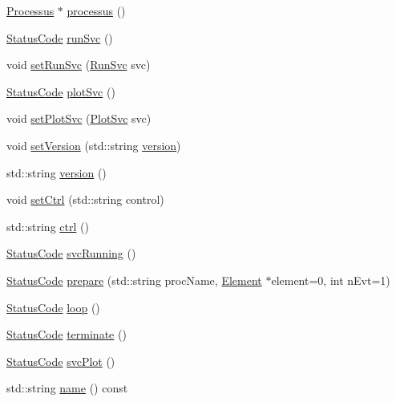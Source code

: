 \begin{DoxyCompactItemize}
\item 
\hyperlink{classProcessus}{Processus} $\ast$ \hyperlink{classApplication_a8d0918e800a5de01795bc2669d74ed82}{processus} ()
\item 
\hyperlink{classStatusCode}{Status\+Code} \hyperlink{classApplication_abfbf40397efe6ff0627d2ce1a55381ce}{run\+Svc} ()
\item 
void \hyperlink{classApplication_a95ea0ef35377c259687752aedc4b9321}{set\+Run\+Svc} (\hyperlink{Application_8h_a59643f52f9391fa83f137814aaae27ef}{Run\+Svc} svc)
\item 
\hyperlink{classStatusCode}{Status\+Code} \hyperlink{classApplication_a6344c22495ff3e87d77d0c47aea3bf00}{plot\+Svc} ()
\item 
void \hyperlink{classApplication_ac11402510105adf9a9ccf3daa25ea7d4}{set\+Plot\+Svc} (\hyperlink{Application_8h_abaa10d33ca2837dfcf8ba9bff40cdbb6}{Plot\+Svc} svc)
\item 
void \hyperlink{classApplication_a48ecc3d76b3f2390ae1ba76d13f8bd54}{set\+Version} (std\+::string \hyperlink{classApplication_a060ac7b6d3a6cb111a9ed39bfd0350d1}{version})
\item 
std\+::string \hyperlink{classApplication_a060ac7b6d3a6cb111a9ed39bfd0350d1}{version} ()
\item 
void \hyperlink{classApplication_a451a04a80f59a76fb13b6fae6c07439a}{set\+Ctrl} (std\+::string control)
\item 
std\+::string \hyperlink{classApplication_a3eb11c9a1985a3a9d2ec51df957f7c2f}{ctrl} ()
\item 
\hyperlink{classStatusCode}{Status\+Code} \hyperlink{classApplication_a35eca6b5e618b508a0736d032e2a9203}{svc\+Running} ()
\item 
\hyperlink{classStatusCode}{Status\+Code} \hyperlink{classApplication_a61dcc20b7f4b7c19b697db7516a62afa}{prepare} (std\+::string proc\+Name, \hyperlink{classElement}{Element} $\ast$element=0, int n\+Evt=1)
\item 
\hyperlink{classStatusCode}{Status\+Code} \hyperlink{classApplication_ab38055646202ef49c9ee2eda6d48076f}{loop} ()
\item 
\hyperlink{classStatusCode}{Status\+Code} \hyperlink{classApplication_a1a36a06d48d94a9a8fdc29a77d2cb9f0}{terminate} ()
\item 
\hyperlink{classStatusCode}{Status\+Code} \hyperlink{classApplication_a297f55c288c32cbdadadcbbc26ae7692}{svc\+Plot} ()
\item 
std\+::string \hyperlink{classObject_a300f4c05dd468c7bb8b3c968868443c1}{name} () const

\end{DoxyCompactItemize}
